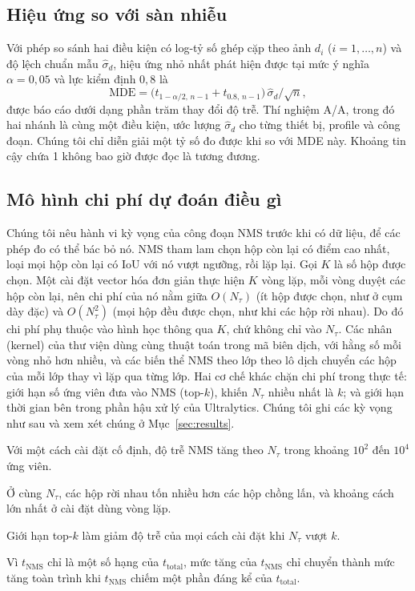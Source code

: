 \documentclass[a4paper,fleqn]{cas-dc}
\newcommand{\Ntau}{N_{\tau}}
\begin{document}
\subsection{Hiệu ứng so với sàn nhiễu}
Với phép so sánh hai điều kiện có log-tỷ số ghép cặp theo ảnh $d_i$ ($i=1,\dots,n$) và độ lệch chuẩn mẫu $\hat\sigma_d$, hiệu ứng nhỏ nhất phát hiện được tại mức ý nghĩa $\alpha=0{,}05$ và lực kiểm định $0{,}8$ là
\begin{equation}
\mathrm{MDE}=\bigl(t_{1-\alpha/2,\,n-1}+t_{0.8,\,n-1}\bigr)\,\hat\sigma_d/\sqrt{n},
\end{equation}
được báo cáo dưới dạng phần trăm thay đổi độ trễ. Thí nghiệm A/A, trong đó hai nhánh là cùng một điều kiện, ước lượng $\hat\sigma_d$ cho từng thiết bị, profile và công đoạn. Chúng tôi chỉ diễn giải một tỷ số đo được khi so với MDE này. Khoảng tin cậy chứa 1 không bao giờ được đọc là tương đương.

\subsection{Mô hình chi phí dự đoán điều gì}
Chúng tôi nêu hành vi kỳ vọng của công đoạn NMS trước khi có dữ liệu, để các phép đo có thể bác bỏ nó. NMS tham lam chọn hộp còn lại có điểm cao nhất, loại mọi hộp còn lại có IoU với nó vượt ngưỡng, rồi lặp lại. Gọi $K$ là số hộp được chọn. Một cài đặt vector hóa đơn giản thực hiện $K$ vòng lặp, mỗi vòng duyệt các hộp còn lại, nên chi phí của nó nằm giữa $O(\Ntau)$ (ít hộp được chọn, như ở cụm dày đặc) và $O(\Ntau^2)$ (mọi hộp đều được chọn, như khi các hộp rời nhau). Do đó chi phí phụ thuộc vào hình học thông qua $K$, chứ không chỉ vào $\Ntau$. Các nhân (kernel) của thư viện dùng cùng thuật toán trong mã biên dịch, với hằng số mỗi vòng nhỏ hơn nhiều, và các biến thể NMS theo lớp theo lô dịch chuyển các hộp của mỗi lớp thay vì lặp qua từng lớp. Hai cơ chế khác chặn chi phí trong thực tế: giới hạn số ứng viên đưa vào NMS (top-$k$), khiến $\Ntau$ nhiều nhất là $k$; và giới hạn thời gian bên trong phần hậu xử lý của Ultralytics. Chúng tôi ghi các kỳ vọng như sau và xem xét chúng ở Mục~\ref{sec:results}.
\begin{description}[leftmargin=2.5em,labelwidth=2.2em,itemsep=2pt]
\item[H1] Với một cách cài đặt cố định, độ trễ NMS tăng theo $\Ntau$ trong khoảng $10^2$ đến $10^4$ ứng viên.
\item[H2] Ở cùng $\Ntau$, các hộp rời nhau tốn nhiều hơn các hộp chồng lấn, và khoảng cách lớn nhất ở cài đặt dùng vòng lặp.
\item[H3] Giới hạn top-$k$ làm giảm độ trễ của mọi cách cài đặt khi $\Ntau$ vượt $k$.
\item[H4] Vì $t_{\mathrm{NMS}}$ chỉ là một số hạng của $t_{\mathrm{total}}$, mức tăng của $t_{\mathrm{NMS}}$ chỉ chuyển thành mức tăng toàn trình khi $t_{\mathrm{NMS}}$ chiếm một phần đáng kể của $t_{\mathrm{total}}$.
\end{description}
\end{document}
